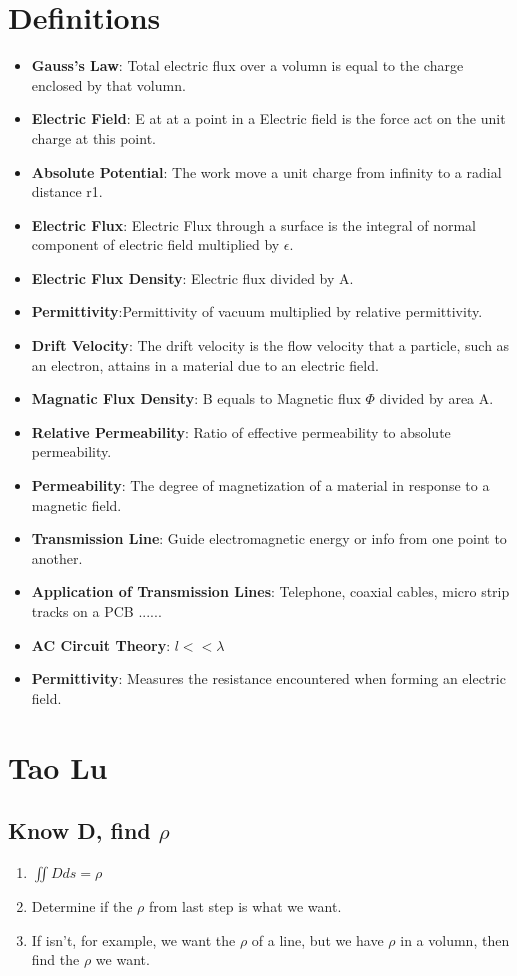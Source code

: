 \documentclass{article}
\begin{document}
  
  \section{Definitions}
  \begin{itemize}
  \item \textbf{Gauss's Law}: Total electric flux over a volumn is equal to the charge enclosed by that volumn.
  \item \textbf{Electric Field}: E at at a point in a Electric field is the force act on the unit charge at this point.
  \item \textbf{Absolute Potential}: The work move a unit charge from infinity to a radial distance r1. 
  \item \textbf{Electric Flux}: Electric Flux through a surface is the integral of normal component of electric field multiplied by $\epsilon$.
  \item \textbf{Electric Flux Density}: Electric flux divided by A.
  \item \textbf{Permittivity}:Permittivity of vacuum multiplied by relative permittivity.
  \item \textbf{Drift Velocity}: The drift velocity is the flow velocity that a particle, such as an electron, attains in a material due to an electric field.
  \item \textbf{Magnatic Flux Density}: B equals to Magnetic flux $\Phi$ divided by area A.
  \item \textbf{Relative Permeability}: Ratio of effective permeability to absolute permeability. 
  \item \textbf{Permeability}:  The degree of magnetization of a material in response to a magnetic field.
  \item \textbf{Transmission Line}: Guide electromagnetic energy or info from one point to another.
  \item \textbf{Application of Transmission Lines}: Telephone, coaxial cables, micro strip tracks on a PCB ......
  \item \textbf{AC Circuit Theory}: $l<<\lambda$
  \item \textbf{Permittivity}: Measures the resistance encountered when forming an electric field.
  \end{itemize}
  
  
  
  \section{Tao Lu}
   \subsection{Know D, find $\rho$}
   \begin{enumerate}
     \item $\iint D ds = \rho$
     \item Determine if the $\rho$ from last step is what we want.
     \item If isn't, for example, we want the $\rho$ of a line, but we have $\rho$ in a volumn, then find the $\rho$ we want.
   \end{enumerate}
   
\end{document}
